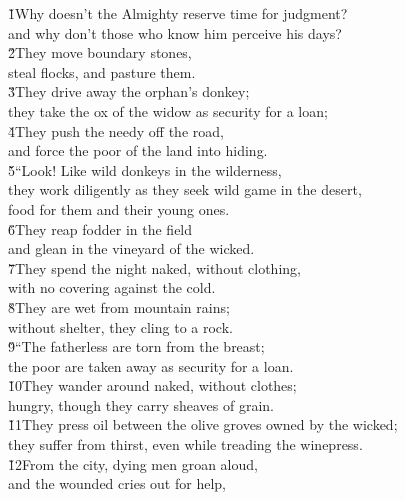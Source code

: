 \begin{poetry}
\poeml {}
\v{1}Why doesn't the Almighty reserve time for judgment? \\
\poemll    and why don't those who know him perceive his days? \\
\poeml \v{2}They move boundary stones, \\
\poemll    steal flocks, and pasture them. \\
\poeml \v{3}They drive away the orphan's donkey; \\
\poemll    they take the ox of the widow as security for a loan; \\
\poeml \v{4}They push the needy off the road, \\
\poemll    and force the poor of the land into hiding. \\
\poeml \v{5}``Look! Like wild donkeys in the wilderness, \\
\poemll    they work diligently as they seek wild game in the desert, \\
\poemlll       food for them and their young ones. \\
\poeml \v{6}They reap fodder in the field \\
\poemll    and glean in the vineyard of the wicked. \\
\poeml \v{7}They spend the night naked, without clothing, \\
\poemll    with no covering against the cold. \\
\poeml \v{8}They are wet from mountain rains; \\
\poemll    without shelter, they cling to a rock. \\
\poeml \v{9}``The fatherless are torn from the breast; \\
\poemll    the poor are taken away as security for a loan. \\
\poeml \v{10}They wander around naked, without clothes; \\
\poemll    hungry, though they carry sheaves of grain. \\
\poeml \v{11}They press oil between the olive groves owned by the wicked; \\
\poemll    they suffer from thirst, even while treading the winepress. \\
\poeml \v{12}From the city, dying men groan aloud, \\
\poemll    and the wounded cries out for help, \\

\end{poetry}
